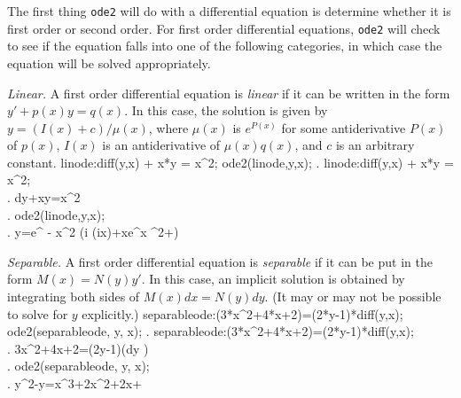 \documentclass{article}
\begin{document}
The first thing \texttt{ode2} will do with a differential equation is
determine whether it is first order or second order.  For first order
differential equations, \texttt{ode2} will check to see if the
equation falls into one of the following categories, in which case the
equation will be solved appropriately.

\medskip

\noindent
\textit{Linear.}\quad
A first order differential equation is \textit{linear} if it can be
written in the form $y' + p(x)y = q(x)$.  In this case, the solution 
is given by $y=\left(I(x)+c\right)/\mu(x)$, where $\mu(x)$ is
$e^{P(x)}$ for some antiderivative $P(x)$ of $p(x)$, 
$I(x)$ is an antiderivative of $\mu(x)q(x)$,
and $c$ is an arbitrary constant.
\beginmaximasession
linode:diff(y,x) + x*y = x^2;
ode2(linode,y,x);
\maximatexsession
{}.  linode:diff(y,x) + x*y = x^2; \\
.   {{d}}\*y+x\*y=x^{2} \\
.  ode2(linode,y,x); \\
.   y=e^ {- {{x^{2}}} }\*\left({{\*\sqrt{\pi}\*i\*
 \left({{i\*x}}\right)}}+x\*e^{{{x
 ^{2}}}}+\right) \\
\endmaximasession

\smallskip

\noindent
\textit{Separable.}\quad
A first order differential equation is \textit{separable} if it can be
put in the form $M(x)=N(y)y'$.  In this case, an implicit solution is
obtained by integrating both sides of $M(x)dx = N(y)dy$.  (It may or
may not be possible to solve for $y$ explicitly.)
\beginmaximasession
separableode:(3*x^2+4*x+2)=(2*y-1)*diff(y,x);
ode2(separableode, y, x);
\maximatexsession
{}.  separableode:(3*x^2+4*x+2)=(2*y-1)*diff(y,x); \\
.   3\*x^{2}+4\*x+2=\left(2\*y-1\right)\*\left({{d}}\*y
 \right) \\
.  ode2(separableode, y, x); \\
.   y^{2}-y=x^{3}+2\*x^{2}+2\*x+ \\
\endmaximasession

\smallskip
\end{document}
